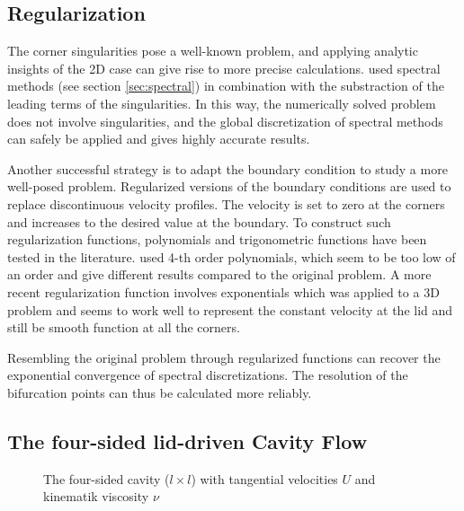 \subsection{Regularization} \label{sec:regul}

The corner singularities pose a well-known problem, and applying analytic
insights of the 2D case can give rise to more precise calculations.
\cite{botella1998} used spectral methods (see section \ref{sec:spectral}) in
combination with the substraction of the leading terms of the singularities. In
this way, the numerically solved problem does not involve singularities, and
the global discretization of spectral methods can safely be applied and gives
highly accurate results. 

Another successful strategy is to adapt the boundary condition to study a more
well-posed problem. Regularized versions of the boundary conditions are used to
replace discontinuous velocity profiles. The velocity is set to zero at the
corners and increases to the desired value at the boundary. To construct such
regularization functions, polynomials \citep{shen1991} and trigonometric
functions have been tested in the literature. \cite{shen1991} used 4-th order
polynomials, which seem to be too low of an order and give different results
compared to the original problem. A more recent regularization function
involves exponentials \citep{lopez2017} which was applied to a 3D problem and
seems to work well to represent the constant velocity at the lid and still be
smooth function at all the corners.

Resembling the original problem through regularized functions can recover the
exponential convergence of spectral discretizations. The resolution of the
bifurcation points can thus be calculated more reliably.  

\subsection{The four-sided lid-driven Cavity Flow} \label{sec:4sc}

\begin{figure}[ht]
\centering
{}
\caption{The four-sided cavity ($l \times l$) with tangential velocities $U$ and
  kinematik viscosity $\nu$ }
\label{fig:cav_4s}
\end{figure}

